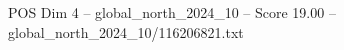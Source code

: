 \begin{textsample}{POS Dim 4 – global\_north\_2024\_10 – Score 19.00 – global\_north\_2024\_10/116206821.txt}
\end{textsample}
